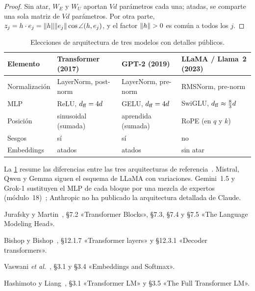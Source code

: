 \begin{proof}
Sin atar, $W_E$ y $W_U$ aportan $Vd$ parámetros cada una; atadas, se comparte una sola matriz de $Vd$ parámetros. Por otra parte, $z_j=h\cdot e_j=\lVert h\rVert\lVert e_j\rVert\cos\angle(h,e_j)$, y el factor $\lVert h\rVert>0$ es común a todos los $j$.
\end{proof}

\begin{table}[ht]
\centering\small
\caption{Elecciones de arquitectura de tres modelos con detalles públicos.}\label{tab:modelos}
\begin{tabular}{@{}llll@{}}
\toprule
Elemento & Transformer (2017) & GPT-2 (2019) & LLaMA / Llama~2 (2023) \\
\midrule
Normalización & LayerNorm, post-norm & LayerNorm, pre-norm & RMSNorm, pre-norm \\
MLP & ReLU, $d_{\mathrm{ff}}=4d$ & GELU, $d_{\mathrm{ff}}=4d$ & SwiGLU, $d_{\mathrm{ff}}\approx\tfrac83 d$ \\
Posición & sinusoidal (sumada) & aprendida (sumada) & RoPE (en $q$ y $k$) \\
Sesgos & sí & sí & no \\
Embeddings & atados & atados & sin atar \\
\bottomrule
\end{tabular}
\end{table}

\begin{observacion}
La \cref{tab:modelos} resume las diferencias entre las tres arquitecturas de referencia~\cite{vaswani,gpt2,llama}. Mistral, Qwen y Gemma siguen el esquema de LLaMA con variaciones. Gemini~1.5 y Grok-1 sustituyen el MLP de cada bloque por una mezcla de expertos (módulo~18)~\cite{gemini15,grok1}; Anthropic no ha publicado la arquitectura detallada de Claude.
\end{observacion}

\begin{lecturas}
\item Jurafsky y Martin~\cite{jm3}, §7.2 «Transformer Blocks», §7.3, §7.4 y §7.5 «The Language Modeling Head».
\item Bishop y Bishop~\cite{bishopdl}, §12.1.7 «Transformer layers» y §12.3.1 «Decoder transformers».
\item Vaswani \emph{et al.}~\cite{vaswani}, §3.1 y §3.4 «Embeddings and Softmax».
\item Hashimoto y Liang~\cite{cs336}, §3.1 «Transformer LM» y §3.5 «The Full Transformer LM».
\end{lecturas}

